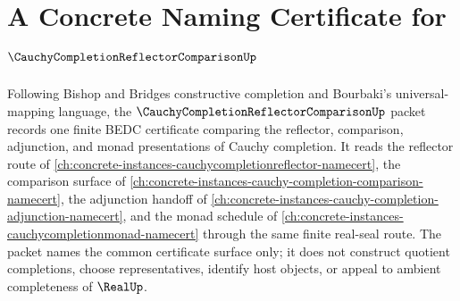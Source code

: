 \chapter{A Concrete Naming Certificate for $\CauchyCompletionReflectorComparisonUp$}
\label{ch:concrete-instances-cauchy-completion-reflector-comparison-namecert}

Following Bishop and Bridges constructive completion and Bourbaki's universal-mapping language, the $\CauchyCompletionReflectorComparisonUp$ packet records one finite BEDC certificate comparing the reflector, comparison, adjunction, and monad presentations of Cauchy completion. It reads the reflector route of \autoref{ch:concrete-instances-cauchycompletionreflector-namecert}, the comparison surface of \autoref{ch:concrete-instances-cauchy-completion-comparison-namecert}, the adjunction handoff of \autoref{ch:concrete-instances-cauchy-completion-adjunction-namecert}, and the monad schedule of \autoref{ch:concrete-instances-cauchycompletionmonad-namecert} through the same finite real-seal route. The packet names the common certificate surface only; it does not construct quotient completions, choose representatives, identify host objects, or appeal to ambient completeness of $\RealUp$.

